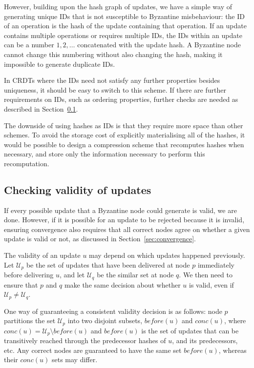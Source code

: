 \documentclass[sigplan,review]{acmart}
\begin{document}
However, building upon the hash graph of updates, we have a simple way of generating unique IDs that is not susceptible to Byzantine misbehaviour: the ID of an operation is the hash of the update containing that operation.
If an update contains multiple operations or requires multiple IDs, the IDs within an update can be a number $1,2,\dots$ concatenated with the update hash.
A Byzantine node cannot change this numbering without also changing the hash, making it impossible to generate duplicate IDs.

In CRDTs where the IDs need not satisfy any further properties besides uniqueness, it should be easy to switch to this scheme.
If there are further requirements on IDs, such as ordering properties, further checks are needed as described in Section~\ref{sec:check-validity}.

The downside of using hashes as IDs is that they require more space than other schemes.
To avoid the storage cost of explicitly materialising all of the hashes, it would be possible to design a compression scheme that recomputes hashes when necessary, and store only the information necessary to perform this recomputation.

\subsection{Checking validity of updates}\label{sec:check-validity}

If every possible update that a Byzantine node could generate is valid, we are done.
However, if it is possible for an update to be rejected because it is invalid, ensuring convergence also requires that all correct nodes agree on whether a given update is valid or not, as discussed in Section~\ref{sec:convergence}.

The validity of an update $u$ may depend on which updates happened previously.
Let $\mathcal{U}_p$ be the set of updates that have been delivered at node $p$ immediately before delivering $u$, and let $\mathcal{U}_q$ be the similar set at node $q$.
We then need to ensure that $p$ and $q$ make the same decision about whether $u$ is valid, even if $\mathcal{U}_p \ne \mathcal{U}_q$.

One way of guaranteeing a consistent validity decision is as follows: node $p$ partitions the set $\mathcal{U}_p$ into two disjoint subsets, $\mathit{before}(u)$ and $\mathit{conc}(u)$, where $\mathit{conc}(u) = \mathcal{U}_p \setminus \mathit{before}(u)$ and $\mathit{before}(u)$ is the set of updates that can be transitively reached through the predecessor hashes of $u$, and its predecessors, etc.
Any correct nodes are guaranteed to have the same set $\mathit{before}(u)$, whereas their $\mathit{conc}(u)$ sets may differ.
\end{document}
